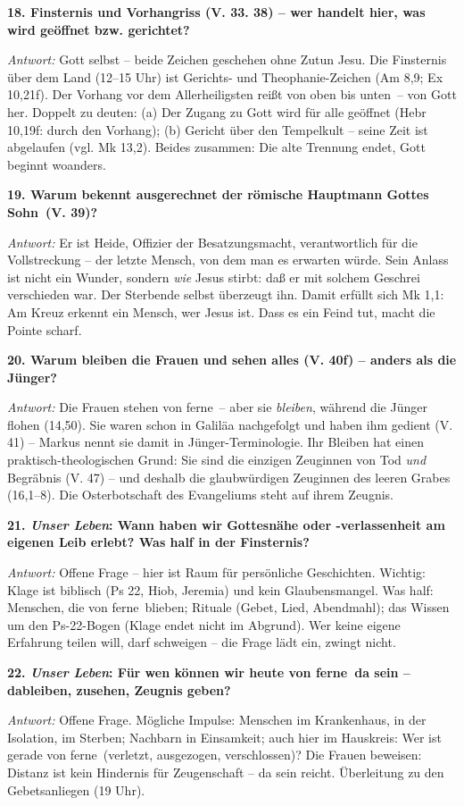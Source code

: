 \documentclass[12pt,a4paper]{article}
\newcommand{\frage}[1]{\par\vspace{0.7em}\noindent\textbf{#1}\par}
\newcommand{\antwort}[1]{\par\noindent\textit{Antwort:} #1\par}
\begin{document}
\frage{18. Finsternis und Vorhangriss (V. 33. 38) -- wer handelt hier, was wird geöffnet bzw. gerichtet?}
\antwort{Gott selbst -- beide Zeichen geschehen ohne Zutun Jesu. Die Finsternis über dem Land (12--15 Uhr) ist Gerichts- und Theophanie-Zeichen (Am 8,9; Ex 10,21f). Der Vorhang vor dem Allerheiligsten reißt \glqq von oben bis unten\grqq\ -- von Gott her. Doppelt zu deuten: (a) Der Zugang zu Gott wird für alle geöffnet (Hebr 10,19f: \glqq durch den Vorhang\grqq{}); (b) Gericht über den Tempelkult -- seine Zeit ist abgelaufen (vgl. Mk 13,2). Beides zusammen: Die alte Trennung endet, Gott beginnt woanders.}

\frage{19. Warum bekennt ausgerechnet der römische Hauptmann \glqq Gottes Sohn\grqq\ (V. 39)?}
\antwort{Er ist Heide, Offizier der Besatzungsmacht, verantwortlich für die Vollstreckung -- der letzte Mensch, von dem man es erwarten würde. Sein Anlass ist nicht ein Wunder, sondern \emph{wie} Jesus stirbt: \glqq daß er mit solchem Geschrei verschieden war\grqq{}. Der Sterbende selbst überzeugt ihn. Damit erfüllt sich Mk 1,1: Am Kreuz erkennt ein Mensch, wer Jesus ist. Dass es ein Feind tut, macht die Pointe scharf.}

\frage{20. Warum bleiben die Frauen und sehen alles (V. 40f) -- anders als die Jünger?}
\antwort{Die Frauen stehen \glqq von ferne\grqq\ -- aber sie \emph{bleiben}, während die Jünger flohen (14,50). Sie waren schon in Galiläa nachgefolgt und haben ihm gedient (V. 41) -- Markus nennt sie damit in Jünger-Terminologie. Ihr Bleiben hat einen praktisch-theologischen Grund: Sie sind die einzigen Zeuginnen von Tod \emph{und} Begräbnis (V. 47) -- und deshalb die glaubwürdigen Zeuginnen des leeren Grabes (16,1--8). Die Osterbotschaft des Evangeliums steht auf ihrem Zeugnis.}

\frage{21. \emph{Unser Leben}: Wann haben wir Gottesnähe oder -verlassenheit am eigenen Leib erlebt? Was half in der Finsternis?}
\antwort{Offene Frage -- hier ist Raum für persönliche Geschichten. Wichtig: Klage ist biblisch (Ps 22, Hiob, Jeremia) und kein Glaubensmangel. Was half: Menschen, die \glqq von ferne\grqq\ blieben; Rituale (Gebet, Lied, Abendmahl); das Wissen um den Ps-22-Bogen (Klage endet nicht im Abgrund). Wer keine eigene Erfahrung teilen will, darf schweigen -- die Frage lädt ein, zwingt nicht.}

\frage{22. \emph{Unser Leben}: Für wen können wir heute \glqq von ferne\grqq\ da sein -- dableiben, zusehen, Zeugnis geben?}
\antwort{Offene Frage. Mögliche Impulse: Menschen im Krankenhaus, in der Isolation, im Sterben; Nachbarn in Einsamkeit; auch hier im Hauskreis: Wer ist gerade \glqq von ferne\grqq\ (verletzt, ausgezogen, verschlossen)? Die Frauen beweisen: Distanz ist kein Hindernis für Zeugenschaft -- da sein reicht. Überleitung zu den Gebetsanliegen (19 Uhr).}
\end{document}
